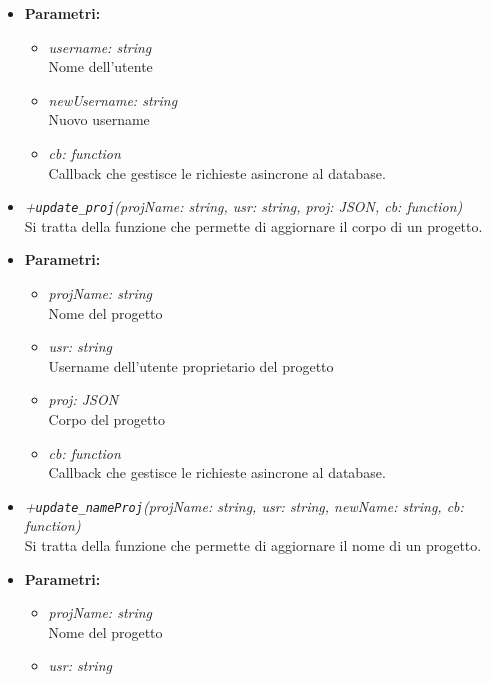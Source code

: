 \begin{itemize}
\begin{itemize}
            \item \textbf{Parametri: }
            \begin{itemize}
              \item \emph{username: string}\\
              Nome dell'utente
              \item \emph{newUsername: string}\\
              Nuovo username
              \item \emph{cb: function}\\
              Callback che gestisce le richieste asincrone al database.
            \end{itemize}
            \item \emph{+\texttt{update\_proj}(projName: string, usr: string, proj: JSON, cb: function)}\\
            Si tratta della funzione che permette di aggiornare il corpo di un progetto.\\
            \item \textbf{Parametri: }
            \begin{itemize}
              \item \emph{projName: string}\\
              Nome del progetto
              \item \emph{usr: string}\\
              Username dell'utente proprietario del progetto
              \item \emph{proj: JSON}\\
              Corpo del progetto
              \item \emph{cb: function}\\
              Callback che gestisce le richieste asincrone al database.
            \end{itemize}
            \item \emph{+\texttt{update\_nameProj}(projName: string, usr: string, newName: string, cb: function)}\\
            Si tratta della funzione che permette di aggiornare il nome di un progetto.\\
            \item \textbf{Parametri: }
            \begin{itemize}
              \item \emph{projName: string}\\
              Nome del progetto
              \item \emph{usr: string}\\

\end{itemize}
\end{itemize}
\end{itemize}
